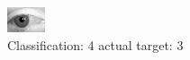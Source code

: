 \begin{figure}[h!]
\begin{center}
\includegraphics[width=0.60\columnwidth]{figures/ID2841_class_4_target_3.png}
\end{center}
\caption{ Classification: 4 actual target: 3}
\label{fig:ID2841_class_4_target_3}
\end{figure}
